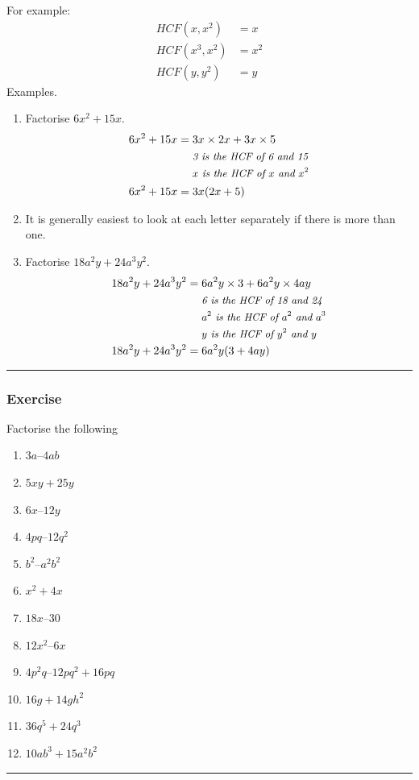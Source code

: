 \documentclass[a4paper,12pt]{article}
\newcommand\question{
	 \rule[0pt]{17cm}{0.5pt}\vspace{-0.5cm}
	\subsubsection{Exercise}

}
\newcommand\questionend{
	\rule[0pt]{17cm}{0.5pt}\vspace{0.0cm}\\
}
\begin{document}
For example:
\begin{align*}
	\textit{HCF}(x,x^{2})&=x\\
	\textit{HCF}(x^{3},x^{2})&=x^{2}\\
	\textit{HCF}(y,y^{2})&=y
\end{align*}
Examples.
\begin{enumerate}
	\item   Factorise $ 6x^{2}+15x$.
	\begin{align*}
		6x^{2}+15x&=3x\times 2x+3x\times 5\\
		&~~~~\text{\small \textit{3 is the HCF of 6 and 15}}\\
		&~~~~\text{\small \textit{$x$ is the HCF of $x$ and $x^{2}$}}\\
		6x^{2}+15x&=3x(2x+5)
	\end{align*}
	\item[]
	It is generally easiest to look at each letter separately if there is more than one.
	\item Factorise $18a^{2}y+24a^{3}y^{2}$.
	\begin{align*}
		18a^{2}y+24a^{3}y^{2}&=6a^{2}y\times 3+6a^{2}y\times 4ay\\& ~~~~   \text{\small \textit{6 is the HCF of 18 and 24}}\\
		&     ~~~~\text{\small \textit{$a^{2}$ is the HCF of $a^{2}$ and $a^{3}$}}\\
		&  ~~~~ \text{\small \textit{$y$ is the HCF of $y^{2}$ and $y$}}\\
		18a^{2}y+24a^{3}y^{2}&=6a^{2}y(3+4ay)
	\end{align*}
\end{enumerate}
\newpage
\question
Factorise the following
\begin{multicols}{2}
	\begin{enumerate}[label=\normalsize \alph*)~~~]
		\item $3a – 4ab $ 
		\item $5xy + 25y$
		\item $6x – 12y $
		\item $4pq – 12q^2$ 
		\item $b^2 – a^2b^2$
		\item $x^2 + 4x $
		\item $18x – 30 $
		\item $12x^2 – 6x$
		\item $4p^2q – 12pq^2 + 16pq$
		\item $16g + 14gh^2$
		\item $36q^5 + 24q^3$
		\item $10ab^3 + 15a^2b^2 $
	\end{enumerate}
\end{multicols}
\questionend
\end{document}

